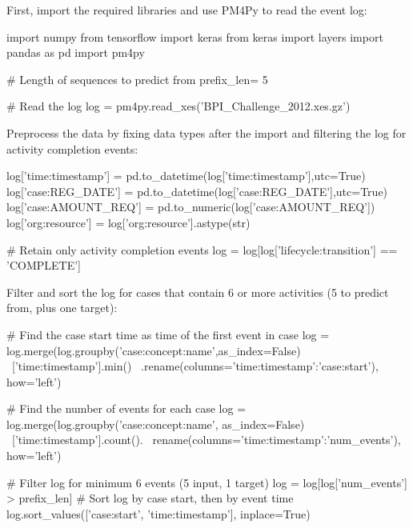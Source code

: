 First, import the required libraries and use PM4Py to read the event log:

\begin{samepage}
\begin{pythoncode}
import numpy
from tensorflow import keras
from keras import layers
import pandas as pd
import pm4py

# Length of sequences to predict from
prefix_len= 5   

# Read the log
log = pm4py.read_xes('BPI_Challenge_2012.xes.gz')  
\end{pythoncode}
\end{samepage}

Preprocess the data by fixing data types after the import and filtering the log for activity completion events:

\begin{samepage}
\begin{pythoncode}
log['time:timestamp'] = pd.to_datetime(log['time:timestamp'],utc=True)
log['case:REG_DATE'] = pd.to_datetime(log['case:REG_DATE'],utc=True)
log['case:AMOUNT_REQ'] = pd.to_numeric(log['case:AMOUNT_REQ'])
log['org:resource'] = log['org:resource'].astype(str)

# Retain only activity completion events
log = log[log['lifecycle:transition'] == 'COMPLETE']
\end{pythoncode}
\end{samepage}

Filter and sort the log for cases that contain 6 or more activities (5 to predict from, plus one target):

\begin{samepage}
\begin{pythoncode}
# Find the case start time as time of the first event in case
log = log.merge(log.groupby('case:concept:name',as_index=False) \
    ['time:timestamp'].min() \
    .rename(columns={'time:timestamp':'case:start'}), how='left')
    
# Find the number of events for each case
log = log.merge(log.groupby('case:concept:name', as_index=False) \
    ['time:timestamp'].count(). \
    rename(columns={'time:timestamp':'num_events'}), how='left')
    
# Filter log for minimum 6 events (5 input, 1 target)
log = log[log['num_events'] > prefix_len]
# Sort log by case start, then by event time
log.sort_values(['case:start', 'time:timestamp'], inplace=True)
\end{pythoncode}
\end{samepage}

